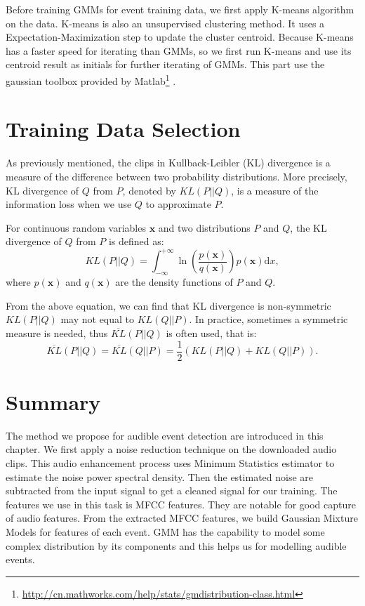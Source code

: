 Before training GMMs for event training data, we first apply K-means algorithm on the data. 
K-means is also an unsupervised clustering method. 
It uses a Expectation-Maximization step to update the cluster centroid. 
Because K-means has a faster speed for iterating than GMMs, so we first run K-means and use its centroid result as initials for further iterating of GMMs. 
This part use the gaussian toolbox provided by Matlab\footnote{\url{http://cn.mathworks.com/help/stats/gmdistribution-class.html}} . 


\section{Training Data Selection}
As previously mentioned, the clips in 
Kullback-Leibler (KL) divergence is a measure of the difference between two probability distributions. More precisely, KL divergence of $Q$ from $P$, denoted by $KL(P||Q)$, is a measure of the information loss when we use $Q$ to approximate $P$.

For continuous random variables $\mathbf{x}$ and two distributions $P$ and $Q$, the KL divergence of $Q$ from $P$ is defined as:
\begin{equation}
KL(P||Q) = \int_{-\infty}^{+\infty}\ln(\frac{p(\mathbf{x})}{q(\mathbf{x})})p(\mathbf{x})\mathrm{d}x,
\label{eq:kl}
\end{equation}
where $p(\mathbf{x})$ and $q(\mathbf{x})$ are the density functions of $P$ and $Q$.

From the above equation, we can find that KL divergence is non-symmetric \ie $KL(P||Q)$ may not equal to $KL(Q||P)$. In practice, sometimes a symmetric measure is needed, thus $\overline{KL}(P||Q)$ is often used, that is:
\begin{equation}
\overline{KL}(P||Q) = \overline{KL}(Q||P) = \frac{1}{2}(KL(P||Q) + KL(Q||P)).
\end{equation}

\section{Summary}
The method we propose for audible event detection are introduced in this chapter. 
We first apply a noise reduction technique on the downloaded audio clips. 
This audio enhancement process uses Minimum Statistics estimator to estimate the noise power spectral density. 
Then the estimated noise are subtracted from the input signal to get a cleaned signal for our training. 
The features we use in this task is MFCC features. 
They are notable for good capture of audio features. 
From the extracted MFCC features, we build Gaussian Mixture Models for features of each event. 
GMM has the capability to model some complex distribution by its components and this helps us for modelling audible events. 
